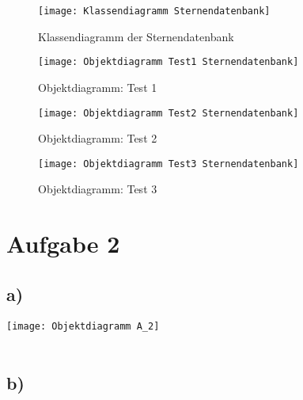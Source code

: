 \documentclass[12pt,a4paper,oneside,ngerman]{article}
\begin{document}
\begin{figure}[ht]
	\centering
	\texttt{[image: Klassendiagramm Sternendatenbank]}
	\caption{Klassendiagramm der Sternendatenbank}
	\label{fig1}
\end{figure}

\begin{figure}[ht]
	\centering
	\texttt{[image: Objektdiagramm Test1 Sternendatenbank]}
	\caption{Objektdiagramm: Test 1}
	\label{fig2}
\end{figure}

\begin{figure}[ht]
	\centering
	\texttt{[image: Objektdiagramm Test2 Sternendatenbank]}
	\caption{Objektdiagramm: Test 2}
	\label{fig3}
\end{figure}

\begin{figure}[ht]
	\centering
	\texttt{[image: Objektdiagramm Test3 Sternendatenbank]}
	\caption{Objektdiagramm: Test 3}
	\label{fig4}
\end{figure}



	
    \section{Aufgabe 2}
        \subsection{a)}
            \texttt{[image: Objektdiagramm A\_2]}\\\\
        \subsection{b)}
\end{document}
